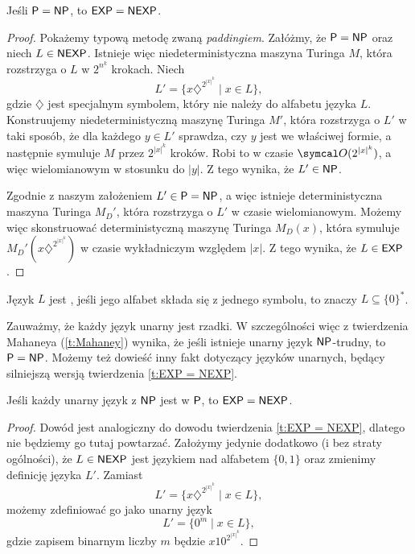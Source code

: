\begin{theorem}\label{t:EXP = NEXP}
    Jeśli $\textsf{P} = \textsf{NP}$, to $\textsf{EXP} = \textsf{NEXP}$.
\end{theorem}
\begin{proof}
    Pokażemy typową metodę zwaną \textit{paddingiem}. Załóżmy, że $\textsf{P} = \textsf{NP}$ oraz niech $L \in \textsf{NEXP}$. Istnieje więc niedeterministyczna maszyna Turinga $M$, która rozstrzyga o $L$ w $2^{n^k}$ krokach. Niech
    \[ L' = \{x\diamondsuit^{2^{|x|^k}} \mid x \in L\}, \]
    gdzie $\diamondsuit$ jest specjalnym symbolem, który nie należy do alfabetu języka $L$. Konstruujemy niedeterministyczną maszynę Turinga $M'$, która rozstrzyga o $L'$ w taki sposób, że dla każdego $y \in L'$ sprawdza, czy $y$ jest we właściwej formie, a następnie symuluje $M$ przez $2^{|x|^k}$ kroków. Robi to w czasie $\sO(2^{|x|^k})$, a więc wielomianowym w stosunku do $|y|$. Z tego wynika, że $L' \in \textsf{NP}$.

    Zgodnie z naszym założeniem $L' \in \textsf{P} = \textsf{NP}$, a więc istnieje deterministyczna maszyna Turinga $M_D'$, która rozstrzyga o $L'$ w czasie wielomianowym. Możemy więc skonstruować deterministyczną maszynę Turinga $M_D(x)$, która symuluje $M_D'(x\diamondsuit^{2^{|x|^k}})$ w czasie wykładniczym względem $|x|$. Z tego wynika, że $L \in \textsf{EXP}$.
\end{proof}

\begin{definition}
    Język $L$ jest , jeśli jego alfabet składa się z jednego symbolu, to znaczy $L \subseteq \{0\}^*$.
\end{definition}

Zauważmy, że każdy język unarny jest rzadki. W szczególności więc z twierdzenia Mahaneya (\ref{t:Mahaney}) wynika, że jeśli istnieje unarny język $\textsf{NP}$-trudny, to $\textsf{P} = \textsf{NP}$. Możemy też dowieść inny fakt dotyczący języków unarnych, będący silniejszą wersją twierdzenia \ref{t:EXP = NEXP}.

\begin{theorem}
    Jeśli każdy unarny język z $\textsf{NP}$ jest w $\textsf{P}$, to $\textsf{EXP} = \textsf{NEXP}$.
\end{theorem}
\begin{proof}
    Dowód jest analogiczny do dowodu twierdzenia \ref{t:EXP = NEXP}, dlatego nie będziemy go tutaj powtarzać. Założymy jedynie dodatkowo (i bez straty ogólności), że $L \in \textsf{NEXP}$ jest językiem nad alfabetem $\{0, 1\}$ oraz zmienimy definicję języka $L'$. Zamiast
    \[ L' = \{x\diamondsuit^{2^{|x|^k}} \mid x \in L\}, \]
    możemy zdefiniować go jako unarny język
    \[ L' = \{0^m \mid x \in L\}, \]
    gdzie zapisem binarnym liczby $m$ będzie $x10^{2^{|x|^k}}$.
\end{proof}


